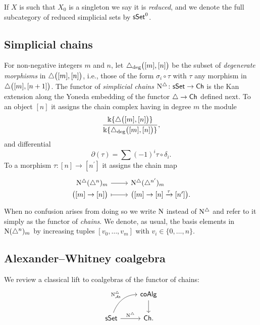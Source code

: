 If $X$ is such that $X_0$ is a singleton we say it is \textit{reduced}, and we denote the full subcategory of reduced simplicial sets by $\mathsf{sSet}^0$.

\subsection{Simplicial chains} \label{ss:simplicial sets}

For non-negative integers $m$ and $n$, let $\triangle_{\deg} \big( [m], [n] \big)$ be the subset of \textit{degenerate morphisms} in $\triangle \big( [m], [n] \big)$, i.e., those of the form $\sigma_i \circ \tau$ with $\tau$ any morphism in $\triangle \big( [m], [n+1] \big)$.
The functor of \textit{simplicial chains} $\operatorname{N^{\triangle}} \colon \mathsf{sSet} \to \mathsf{Ch}$ is the Kan extension along the Yoneda embedding of the functor $\triangle \to \mathsf{Ch}$ defined next.
To an object $[n]$ it assigns the chain complex having in degree $m$ the module
\[
\frac{\Bbbk\{\triangle \big( [m], [n] \big) \}}{\Bbbk\{\triangle_{\deg} \big( [m], [n] \big) \}},
\]
and differential
\[
\partial(\tau) = \sum (-1)^i \tau \circ \delta_i.
\]
To a morphism $\tau \colon [n] \to [n^\prime]$ it assigns the chain map
\[
\begin{tikzcd}[row sep=-3pt, column sep=normal,
/tikz/column 1/.append style={anchor=base east},
/tikz/column 2/.append style={anchor=base west}]
\schains(\simplex^n)_m \arrow[r] & \schains(\simplex^{n^\prime})_m \\
\big( [m] \to [n] \big) \arrow[r, mapsto] & \big( [m] \to [n] \xra{\tau} [n^\prime] \big).
\end{tikzcd}
\]
When no confusion arises from doing so we write $\operatorname{N}$ instead of $\operatorname{N^{\triangle}}$ and refer to it simply as the functor of \textit{chains}.
We denote, as usual, the basis elements in $\operatorname{N}(\triangle^n)_m$ by increasing tuples $[v_0, \dots, v_m]$ with $v_i \in \{0, \dots, n\}$.

\subsection{Alexander--Whitney coalgebra} \label{ss:aw coalgebra}

We review a classical lift to coalgebras of the functor of chains:
\[
\begin{tikzcd}
& \coAlg \arrow[d] \\
\sSet \arrow[r, "\schains"] \arrow[ur, "\schainsAs", out=70, in=180] & \Ch.
\end{tikzcd}
\]

